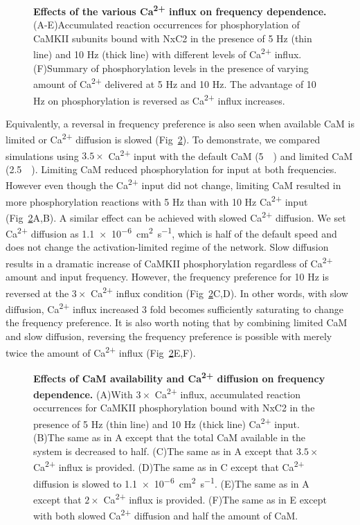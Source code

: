 \documentclass[10pt,letterpaper]{article}
\begin{document}
\begin{figure}[!h]
	\caption{{\bf Effects of the various Ca\textsuperscript{2+} influx on frequency dependence.}
	(A-E)Accumulated reaction occurrences for phosphorylation of CaMKII subunits bound with NxC2 in the presence of 5 Hz (thin line) and 10 Hz (thick line) with different levels of Ca\textsuperscript{2+} influx. 
	(F)Summary of phosphorylation levels in the presence of varying amount of Ca\textsuperscript{2+} delivered at 5 Hz and 10 Hz. The advantage of 10 Hz on phosphorylation is reversed as Ca\textsuperscript{2+} influx increases.
	}
\label{fig8}
\end{figure}

Equivalently, a reversal in frequency preference is also seen when available CaM is limited or Ca\textsuperscript{2+} diffusion is slowed (Fig~\ref{fig9}). To demonstrate, we compared simulations using $3.5\times$ Ca\textsuperscript{2+} input with the default CaM (\SI{5}{\micro\Molar}) and limited CaM (\SI{2.5}{\micro\Molar}). Limiting CaM reduced phosphorylation for input at both frequencies. However even though the Ca\textsuperscript{2+} input did not change, limiting CaM resulted in more phosphorylation reactions with 5 Hz than with 10 Hz Ca\textsuperscript{2+} input (Fig~\ref{fig9}A,B). A similar effect can be achieved with slowed Ca\textsuperscript{2+} diffusion. We set Ca\textsuperscript{2+} diffusion as \SI{1.1e-6}{\square\cm\per\s}, which is half of the default speed and does not change the activation-limited regime of the network. Slow diffusion results in a dramatic increase of CaMKII phosphorylation regardless of Ca\textsuperscript{2+} amount and input frequency. However, the frequency preference for 10 Hz is reversed at the $3\times$ Ca\textsuperscript{2+} influx condition (Fig~\ref{fig9}C,D). In other words, with slow diffusion, Ca\textsuperscript{2+} influx increased 3 fold becomes sufficiently saturating to change the frequency preference. It is also worth noting that by combining limited CaM and slow diffusion, reversing the frequency preference is possible with merely twice the amount of Ca\textsuperscript{2+} influx (Fig~\ref{fig9}E,F). 

\begin{figure}[!h]
	\caption{{\bf Effects of CaM availability and Ca\textsuperscript{2+} diffusion on frequency dependence.}
	(A)With $3\times$ Ca\textsuperscript{2+} influx, accumulated reaction occurrences for CaMKII phosphorylation bound with NxC2 in the presence of 5 Hz (thin line) and 10 Hz (thick line) Ca\textsuperscript{2+} input.
	(B)The same as in A except that the total CaM available in the system is decreased to half. 
	(C)The same as in A except that $3.5\times$ Ca\textsuperscript{2+} influx is provided.
	(D)The same as in C except that Ca\textsuperscript{2+} diffusion is slowed to \SI{1.1e-6}{\square\cm\per\s}. 
	(E)The same as in A except that $2\times$ Ca\textsuperscript{2+} influx is provided.
	(F)The same as in E except with both slowed Ca\textsuperscript{2+} diffusion and half the amount of CaM.
	}
\label{fig9}
\end{figure}
\end{document}
